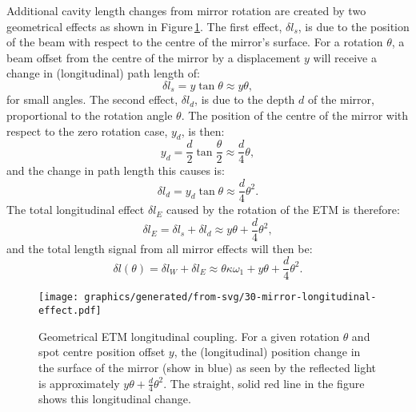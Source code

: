 Additional cavity length changes from mirror rotation are created by two geometrical effects as shown in Figure\,\ref{fig:mirror-longitudinal-effect}. The first effect, $\delta l_s$, is due to the position of the beam with respect to the centre of the mirror's surface. For a rotation $\theta$, a beam offset from the centre of the mirror by a displacement $y$ will receive a change in (longitudinal) path length of:
\begin{equation}
  \label{eq:offset-effect}
  \delta l_s = y \tan{\theta} \approx y \theta,
\end{equation}
for small angles. The second effect, $\delta l_d$, is due to the depth $d$ of the mirror, proportional to the rotation angle $\theta$. The position of the centre of the mirror with respect to the zero rotation case, $y_d$, is then:
\begin{equation}
  y_d = \frac{d}{2} \tan{\frac{\theta}{2}} \approx \frac{d}{4} \theta,
\end{equation}
and the change in path length this causes is:
\begin{equation}
  \delta l_d = y_d \tan{\theta} \approx \frac{d}{4} \theta^2.
\end{equation}
The total longitudinal effect $\delta l_E$ caused by the rotation of the \gls{ETM} is therefore:
\begin{equation}
  \label{eq:etm-length-change}
  \delta l_E = \delta l_s + \delta l_d \approx y \theta + \frac{d}{4} \theta^2,
\end{equation}
and the total length signal from all mirror effects will then be:
\begin{equation}
  \label{eq:cavity-length-change}
  \delta l \left( \theta \right) = \delta l_W + \delta l_E \approx \theta \kappa \omega_1 + y \theta + \frac{d}{4} \theta^2.
\end{equation}

\begin{figure}
  \centering
  \texttt{[image: graphics/generated/from-svg/30-mirror-longitudinal-effect.pdf]}
  \caption[Geometrical end test mass longitudinal coupling]{\label{fig:mirror-longitudinal-effect}Geometrical \gls{ETM} longitudinal coupling. For a given rotation $\theta$ and spot centre position offset $y$, the (longitudinal) position change in the surface of the mirror (show in blue) as seen by the reflected light is approximately $y \theta + \frac{d}{4} \theta^2$. The straight, solid red line in the figure shows this longitudinal change.}
\end{figure}

